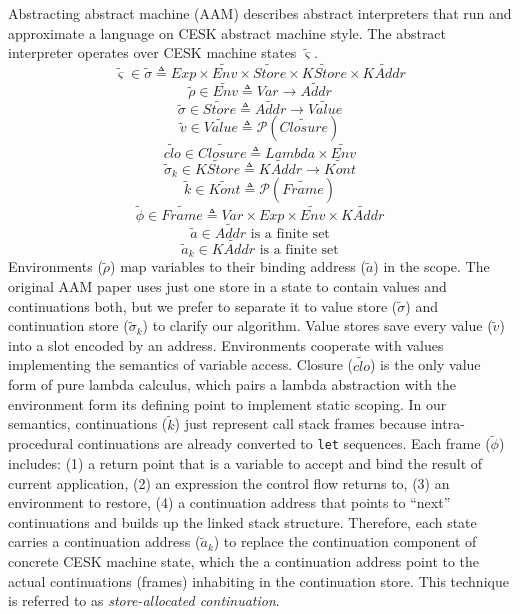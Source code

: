 \documentclass[12pt]{report}
\begin{document}
Abstracting abstract machine (AAM) describes abstract interpreters that run and approximate a language on CESK abstract machine style.
The abstract interpreter operates over CESK machine states $\tilde{\varsigma}$.
\[
\tag{states}
\tilde{\varsigma}\in\tilde{\sigma} \triangleq Exp \times \widetilde{Env} \times \widetilde{Store}
\times \widetilde{KStore} \times \widetilde{KAddr}
\]
\[
\tag{environments}
\tilde{\rho} \in \widetilde{Env} \triangleq Var \to \widetilde{Addr}
\]
\[
\tag{stores}
\tilde{\sigma} \in \widetilde{Store} \triangleq \widetilde{Addr} \to \widetilde{Value}
\]
\[
\tag{abstract values}
\tilde{v} \in \widetilde{Value} \triangleq \mathcal{P}(\widetilde{Closure})
\]
\[
\tag{closures}
\widetilde{clo} \in \widetilde{Closure} \triangleq Lambda \times \widetilde{Env}
\]
\[
\tag{continuation stores}
\tilde{\sigma}_k \in \widetilde{KStore} \triangleq  \widetilde{KAddr} \to  \widetilde{Kont}
\]
\[
\tag{abstract continuations}
\widetilde{k} \in  \widetilde{Kont} \triangleq  \mathcal{P}(\widetilde{Frame})
\]
\[
\tag{stack frames}
\widetilde{\phi} \in  \widetilde{Frame} \triangleq Var \times Exp \times  \widetilde{Env} \times  \widetilde{KAddr}
\]
\[
\tag{value addresses}
\tilde{a} \in \widetilde{Addr} \mbox{ is a finite set}
\]
\[
\tag{continuation addresses}
\tilde{a}_k \in \widetilde{KAddr} \mbox{ is a finite set}
\]
Environments ($\tilde{\rho}$) map variables to their binding address ($\tilde{a}$) in the scope.
The original AAM paper uses just one store in a state to contain values and continuations both, but we prefer to separate it to value store ($\tilde{\sigma}$) and continuation store ($\tilde{\sigma}_k$) to clarify our algorithm.
Value stores save every value ($\tilde{v}$) into a slot encoded by an address. Environments cooperate with values implementing the semantics of variable access.
Closure ($\widetilde{clo}$) is the only value form of pure lambda calculus, which pairs a lambda abstraction with the environment form its defining point to implement static scoping.
In our semantics, continuations ($\widetilde{k}$) just represent call stack frames because intra-procedural continuations are already converted to \verb|let| sequences.
Each frame ($\widetilde{\phi}$) includes:
(1) a return point that is a variable to accept and bind the result of current application,
(2) an expression the control flow returns to,
(3) an environment to restore,
(4) a continuation address that points to ``next'' continuations and builds up the linked stack structure.
Therefore, each state carries a continuation address ($\tilde{a}_k$) to replace the continuation component of concrete CESK machine state, which the a continuation address point to the actual continuations (frames) inhabiting in the continuation store.
This technique is referred to as \emph{store-allocated continuation}.
\end{document}

